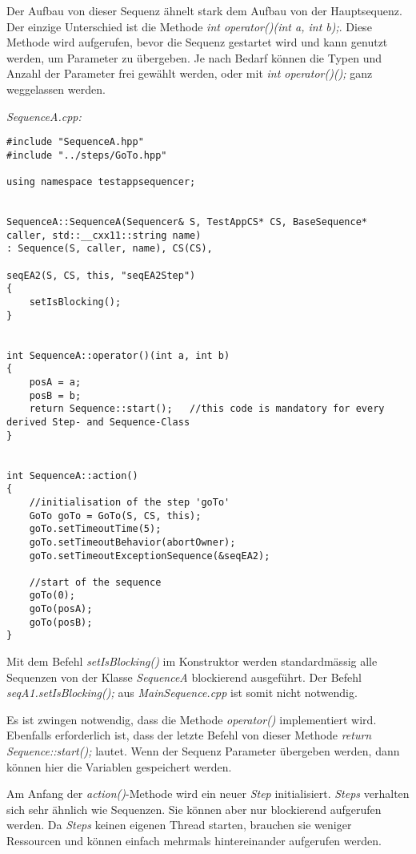Der Aufbau von dieser Sequenz ähnelt stark dem Aufbau von der Hauptsequenz.
Der einzige Unterschied ist die Methode \textit{int operator()(int a, int b);}.
Diese Methode wird aufgerufen, bevor die Sequenz gestartet wird und kann genutzt werden, um Parameter zu übergeben.
Je nach Bedarf können die Typen und Anzahl der Parameter frei gewählt werden, oder mit \textit{int operator()();} ganz weggelassen werden.


\textit{SequenceA.cpp:}\
\begin{lstlisting}
#include "SequenceA.hpp"
#include "../steps/GoTo.hpp"

using namespace testappsequencer;


SequenceA::SequenceA(Sequencer& S, TestAppCS* CS, BaseSequence* caller, std::__cxx11::string name)
: Sequence(S, caller, name), CS(CS),

seqEA2(S, CS, this, "seqEA2Step")
{
	setIsBlocking();
}


int SequenceA::operator()(int a, int b)
{
	posA = a;
	posB = b;
	return Sequence::start();	//this code is mandatory for every derived Step- and Sequence-Class
}


int SequenceA::action()
{
	//initialisation of the step 'goTo'
	GoTo goTo = GoTo(S, CS, this);
	goTo.setTimeoutTime(5);
 	goTo.setTimeoutBehavior(abortOwner);
	goTo.setTimeoutExceptionSequence(&seqEA2);
	
	//start of the sequence
	goTo(0);
	goTo(posA);
	goTo(posB);
}

\end{lstlisting}

Mit dem Befehl \textit{setIsBlocking()} im Konstruktor werden standardmässig alle Sequenzen von der Klasse \textit{SequenceA} blockierend ausgeführt.
Der Befehl \textit{seqA1.setIsBlocking();} aus \textit{MainSequence.cpp} ist somit nicht notwendig.

Es ist zwingen notwendig, dass die Methode \textit{operator()} implementiert wird.
Ebenfalls erforderlich ist, dass der letzte Befehl von dieser Methode \textit{return Sequence::start();}  lautet.
Wenn der Sequenz Parameter übergeben werden, dann können hier die Variablen gespeichert werden.

Am Anfang der \textit{action()}-Methode wird ein neuer \textit{Step} initialisiert.
\textit{Steps} verhalten sich sehr ähnlich wie Sequenzen.
Sie können aber nur blockierend aufgerufen werden.
Da \textit{Steps} keinen eigenen Thread starten, brauchen sie weniger Ressourcen und können einfach mehrmals hintereinander aufgerufen werden.



